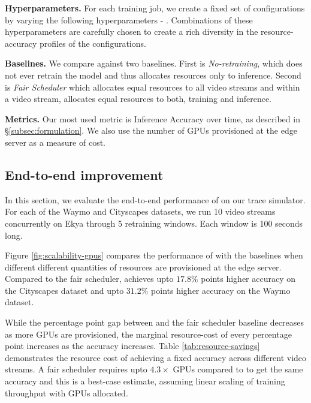 \textbf{Hyperparameters.}
For each training job, we create a fixed set of configurations by varying the following hyperparameters - . Combinations of these hyperparameters are carefully chosen to create a rich diversity in the resource-accuracy profiles of the configurations. 

\textbf{Baselines.}
We compare against two baselines. First is \textit{No-retraining}, which does not ever retrain the model and thus allocates resources only to inference. Second is \textit{Fair Scheduler}\cite{fairsched} which allocates equal resources to all video streams and within a video stream, allocates equal resources to both, training and inference.

\textbf{Metrics.}
Our most used metric is Inference Accuracy over time, as described in \S\ref{subsec:formulation}. We also use the number of GPUs provisioned at the edge server as a measure of cost.

\subsection{End-to-end improvement}
\label{subsec:e2e-improvement}

In this section, we evaluate the end-to-end performance of \name{} on our trace simulator. For each of the Waymo and Cityscapes datasets, we run 10 video streams concurrently on Ekya through 5 retraining windows. Each window is 100 seconds long.

Figure \ref{fig:scalability-gpus} compares the performance of \name{} with the baselines when different different quantities of resources are provisioned at the edge server. Compared to the fair scheduler, \name{} achieves upto $17.8\%$ points higher accuracy on the Cityscapes dataset and upto $31.2\%$  points higher accuracy on the Waymo dataset. 

While the percentage point gap between \name{} and the fair scheduler baseline decreases as more GPUs are provisioned, the marginal resource-cost of every percentage point increases as the accuracy increases. Table \ref{tab:resource-savings} demonstrates the resource cost of achieving a fixed accuracy across different video streams. A fair scheduler requires upto $4.3\times$ GPUs compared to \name{} to get the same accuracy and this is a best-case estimate, assuming linear scaling of training throughput with GPUs allocated.


